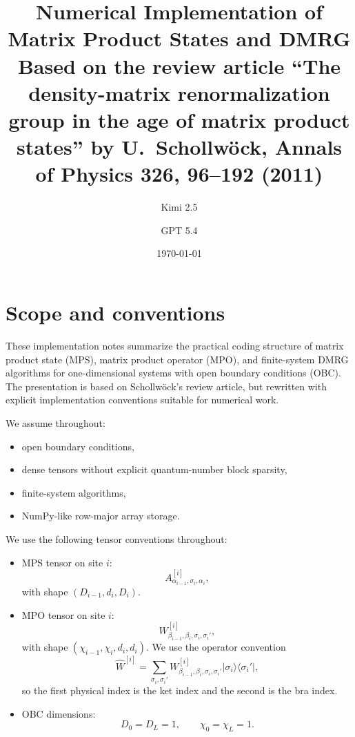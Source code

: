 \documentclass[aps,prb,onecolumn,nofootinbib]{revtex4-2}
\newcommand{\ket}[1]{|#1\rangle}
\newcommand{\bra}[1]{\langle #1|}
\begin{document}
	
	\title{\texorpdfstring{Numerical Implementation of Matrix Product States and DMRG\\
			\large Based on the review article ``The density-matrix renormalization group in the age of matrix product states'' by U.~Schollw\"ock, Annals of Physics \textbf{326}, 96--192 (2011)}
		{Numerical Implementation of Matrix Product States and DMRG}}
	
	\author{Kimi 2.5}
	\author{GPT 5.4}
	\date{\today}
	
	\maketitle
	
	\tableofcontents
	
	\section{Scope and conventions}
	
	These implementation notes summarize the practical coding structure of matrix product state (MPS), matrix product operator (MPO), and finite-system DMRG algorithms for one-dimensional systems with open boundary conditions (OBC). The presentation is based on Schollw\"ock's review article, but rewritten with explicit implementation conventions suitable for numerical work.
	
	We assume throughout:
	\begin{itemize}
		\item open boundary conditions,
		\item dense tensors without explicit quantum-number block sparsity,
		\item finite-system algorithms,
		\item NumPy-like row-major array storage.
	\end{itemize}
	
	We use the following tensor conventions throughout:
	\begin{itemize}
		\item MPS tensor on site $i$:
		\[
		A^{[i]}_{\alpha_{i-1},\sigma_i,\alpha_i},
		\]
		with shape $(D_{i-1}, d_i, D_i)$.
		\item MPO tensor on site $i$:
		\[
		W^{[i]}_{\beta_{i-1},\beta_i,\sigma_i,\sigma_i'},
		\]
		with shape $(\chi_{i-1}, \chi_i, d_i, d_i)$. We use the operator convention
		\[
		\hat W^{[i]}
		=
		\sum_{\sigma_i,\sigma_i'}
		W^{[i]}_{\beta_{i-1},\beta_i,\sigma_i,\sigma_i'}
		\ket{\sigma_i}\bra{\sigma_i'},
		\]
		so the first physical index is the ket index and the second is the bra index.
		\item OBC dimensions:
		\[
		D_0 = D_L = 1,\qquad \chi_0 = \chi_L = 1.
		\]
	\end{itemize}
	
\end{document}
